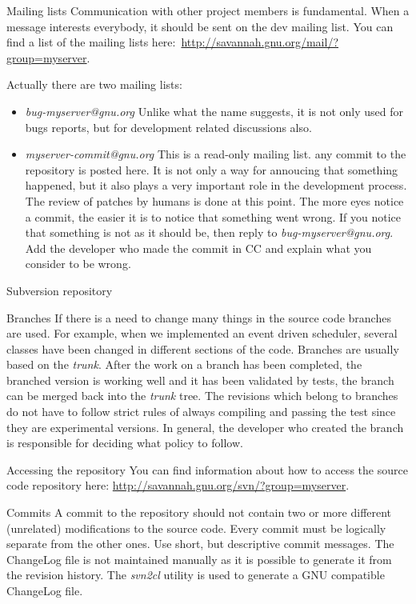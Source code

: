 \documentclass[12pt]{article}
\begin{document}
\begin{section}{Mailing lists}\label{section:ml}
Communication with other project members is fundamental. When a
message interests everybody, it should be sent on the dev mailing
list. You can find a list of the mailing lists
here:~\url{http://savannah.gnu.org/mail/?group=myserver}.

Actually there are two mailing lists:
\begin{itemize}
\item \textit{bug-myserver@gnu.org} Unlike what the name suggests,
  it is not only used for bugs reports, but for development
  related discussions also.
\item \textit{myserver-commit@gnu.org} This is a read-only mailing list.
  any commit to the repository is posted here.  It is not only a way
  for annoucing that something happened, but it also plays a very important
  role in the development process.  The review of patches by humans is done
  at this point. The more eyes notice a commit, the easier it is to notice that something went wrong.  If you notice that something is not
  as it should be, then reply to \textit{bug-myserver@gnu.org}.
  Add the developer who made the commit in CC and explain what you
  consider to be wrong.
\end{itemize}
\end{section}

\begin{section}{Subversion repository}\label{section:svn}
\begin{subsection}{Branches}
If there is a need to change many things in the source code branches are used.
For example, when we implemented an event driven scheduler, 
several classes have been changed in different sections of the code.
Branches are usually based on the \textit{trunk}.
After the work on a branch has been completed, the branched version is working
well and it has been validated by tests, the branch can be merged back into the
\textit{trunk} tree.
The revisions which belong to branches do not have to follow strict rules of always compiling and passing the test since they are experimental versions.
In general, the developer who created the branch is responsible for deciding what policy to follow.
\end{subsection}

\begin{subsection}{Accessing the repository}
You can find information about how to access the source code repository here:
\url{http://savannah.gnu.org/svn/?group=myserver}.
\end{subsection}

\begin{subsection}{Commits}
A commit to the repository should not contain two or more different (unrelated)
modifications to the source code.
Every commit must be logically separate from the other ones. 
Use short, but descriptive commit messages. The ChangeLog file is not
maintained manually as it is possible to generate it from the revision
history.  The \textit{svn2cl} utility is used to generate a GNU compatible
ChangeLog file.
\end{subsection}
\end{section}
\end{document}

